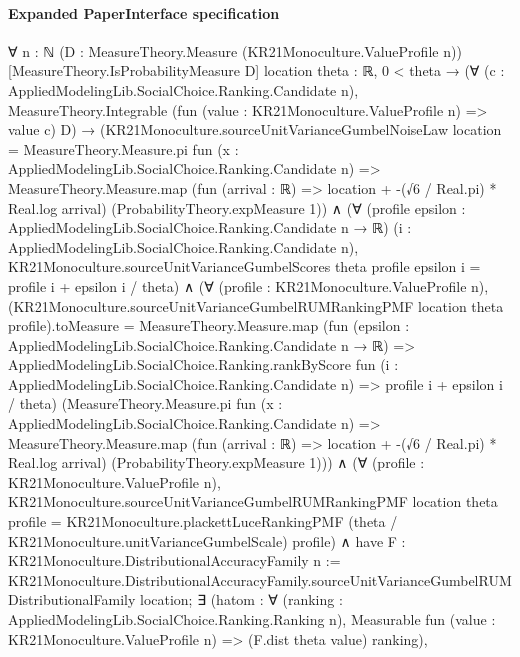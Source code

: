 \documentclass[10pt]{article}
\begin{document}
\paragraph{Expanded PaperInterface specification}
\begin{ReviewVerbatim}
∀ {n : ℕ} (D : MeasureTheory.Measure (KR21Monoculture.ValueProfile n)) [MeasureTheory.IsProbabilityMeasure D]
  {location theta : ℝ},
  0 < theta →
    (∀ (c : AppliedModelingLib.SocialChoice.Ranking.Candidate n),
        MeasureTheory.Integrable (fun (value : KR21Monoculture.ValueProfile n) => value c) D) →
      (KR21Monoculture.sourceUnitVarianceGumbelNoiseLaw location =
          MeasureTheory.Measure.pi fun (x : AppliedModelingLib.SocialChoice.Ranking.Candidate n) =>
            MeasureTheory.Measure.map (fun (arrival : ℝ) => location + -(√6 / Real.pi) * Real.log arrival)
              (ProbabilityTheory.expMeasure 1)) ∧
        (∀ (profile epsilon : AppliedModelingLib.SocialChoice.Ranking.Candidate n → ℝ)
            (i : AppliedModelingLib.SocialChoice.Ranking.Candidate n),
            KR21Monoculture.sourceUnitVarianceGumbelScores theta profile epsilon i = profile i + epsilon i / theta) ∧
          (∀ (profile : KR21Monoculture.ValueProfile n),
              (KR21Monoculture.sourceUnitVarianceGumbelRUMRankingPMF location theta profile).toMeasure =
                MeasureTheory.Measure.map
                  (fun (epsilon : AppliedModelingLib.SocialChoice.Ranking.Candidate n → ℝ) =>
                    AppliedModelingLib.SocialChoice.Ranking.rankByScore
                      fun (i : AppliedModelingLib.SocialChoice.Ranking.Candidate n) => profile i + epsilon i / theta)
                  (MeasureTheory.Measure.pi fun (x : AppliedModelingLib.SocialChoice.Ranking.Candidate n) =>
                    MeasureTheory.Measure.map (fun (arrival : ℝ) => location + -(√6 / Real.pi) * Real.log arrival)
                      (ProbabilityTheory.expMeasure 1))) ∧
            (∀ (profile : KR21Monoculture.ValueProfile n),
                KR21Monoculture.sourceUnitVarianceGumbelRUMRankingPMF location theta profile =
                  KR21Monoculture.plackettLuceRankingPMF (theta / KR21Monoculture.unitVarianceGumbelScale) profile) ∧
              have F : KR21Monoculture.DistributionalAccuracyFamily n :=
                KR21Monoculture.DistributionalAccuracyFamily.sourceUnitVarianceGumbelRUMDistributionalFamily location;
              ∃ (hatom :
                ∀ (ranking : AppliedModelingLib.SocialChoice.Ranking.Ranking n),
                  Measurable fun (value : KR21Monoculture.ValueProfile n) => (F.dist theta value) ranking),

\end{ReviewVerbatim}
\end{document}
